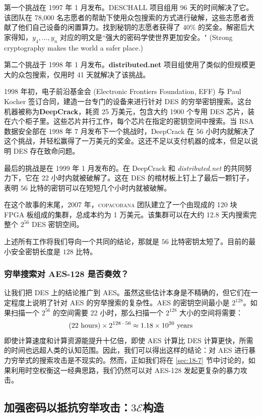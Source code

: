 第一个挑战在 1997 年 1 月发布。DESCHALL 项目组用 96 天的时间解决了它。该团队在 78,000 名志愿者的帮助下使用众包搜索的方式进行破解，这些志愿者贡献了他们自己设备的闲置算力。找到秘钥的志愿者获得了 $40\%$ 的奖金。解密后大家得知，$y_4,\dots,y_n$ 对应的明文是``强大的密码学使世界更加安全。" (Strong cryptography makes the world a safer place.)

第二个挑战于 1998 年 1 月发布。\textbf{distributed.net} 项目组使用了类似的但规模更大的众包搜索，仅用时 41 天就解决了该挑战。

1998 年初，电子前沿基金会 (Electronic Frontiers Foundation, EFF) 与 Paul Kocher 签订合同，建造一台专门的设备来进行针对 DES 的穷举密钥搜索。这台机器被称为\textbf{DeepCrack}，耗资 25 万美元，包含大约 1900 个专用 DES 芯片，装在六个柜子里。这些芯片并行工作，每个芯片在指定的密钥空间中搜索。当 RSA 数据安全部在 1998 年 7 月发布下一个挑战时，DeepCrack 在 56 小时内就解决了这个挑战，并轻松赢得了一万美元的奖金。这还不足以支付机器的成本，但足以说明 DES 存在致命问题。

最后的挑战是在 1999 年 1 月发布的。在 DeepCrack 和 \emph{distributed.net} 的共同努力下，它在 22 小时内就被破解了。这在 DES 的棺材板上钉上了最后一颗钉子，表明 $56$ 比特的密钥可以在短短几个小时内就被破解。

在这个故事的末尾，2007 年，\textsc{copacobana} 团队建立了一个由现成的 120 块 FPGA 板组成的集群，总成本约为 1 万美元。该集群可以在大约 12.8 天内搜索完整个 $2^{56}$ DES 密钥空间。

上述所有工作将我们导向一个共同的结论，那就是 $56$ 比特密钥太短了。目前的最小安全密钥长度是 $128$ 比特。

\subsubsection{穷举搜索对 AES-128 是否奏效？}

让我们把 DES 上的结论推广到 AES。虽然这些估计本身是不精确的，但它们在一定程度上说明了针对 AES 的穷举搜索的复杂性。AES 的密钥空间最小是 $2^{128}$。如果扫描一个 $2^{56}$ 的空间需要 22 小时，那么扫描一个 $2^{128}$ 大小的空间将需要：
\[
(22~{\rm hours})\times2^{128-56}\approx1.18\times10^{20}~{\rm years}
\]
即使计算速度和计算资源能提升十亿倍，即使 AES 计算比 DES 计算更快，所需的时间也远超人类的认知范围。因此，我们可以得出这样的结论：对 AES 进行暴力穷举式的搜索攻击是不现实的。然而，正如我们将在 \ref{sec:18-7} 节中讨论的，如果利用时空权衡这一经典思路，我们仍然可以对 AES-128 发起更复杂的暴力攻击。

\subsection{加强密码以抵抗穷举攻击：$3\mathcal{E}$构造}


